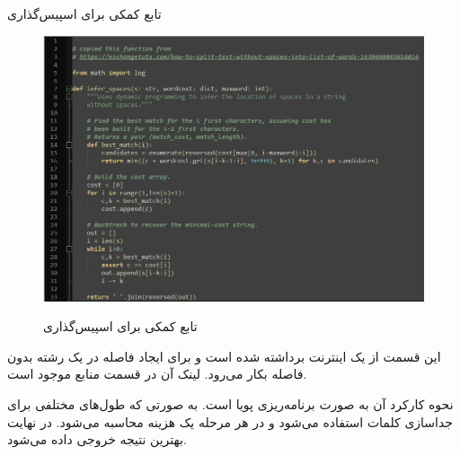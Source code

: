 \SubProblem
{تابع کمکی برای اسپیس‌گذاری}
{
\begin{figure}[H]
    \centering
    \includegraphics[width=15cm]{Images/F6.jpg}
    \label{fig:label}
    \caption{تابع کمکی برای اسپیس‌گذاری}
\end{figure}

این قسمت از یک اینترنت برداشته شده است و برای ایجاد فاصله در یک رشته بدون فاصله بکار می‌رود. لینک آن در قسمت منابع موجود است.

نحوه کارکرد آن به صورت برنامه‌ریزی پویا
است.
به صورتی که طول‌های مختلفی برای جداسازی کلمات استفاده می‌شود و در هر مرحله یک هزینه
محاسبه می‌شود.
در نهایت بهترین نتیجه خروجی داده می‌شود.
}
